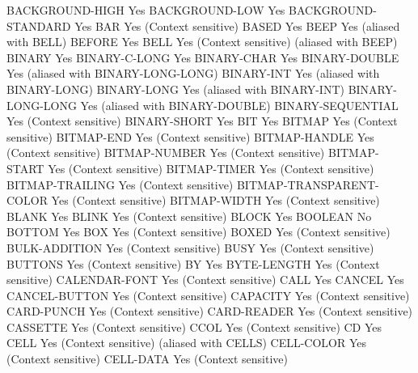 BACKGROUND-HIGH                 Yes
BACKGROUND-LOW                  Yes
BACKGROUND-STANDARD             Yes
BAR                             Yes (Context sensitive)
BASED                           Yes
BEEP                            Yes (aliased with BELL)
BEFORE                          Yes
BELL                            Yes (Context sensitive) (aliased with BEEP)
BINARY                          Yes
BINARY-C-LONG                   Yes
BINARY-CHAR                     Yes
BINARY-DOUBLE                   Yes (aliased with BINARY-LONG-LONG)
BINARY-INT                      Yes (aliased with BINARY-LONG)
BINARY-LONG                     Yes (aliased with BINARY-INT)
BINARY-LONG-LONG                Yes (aliased with BINARY-DOUBLE)
BINARY-SEQUENTIAL               Yes (Context sensitive)
BINARY-SHORT                    Yes
BIT                             Yes
BITMAP                          Yes (Context sensitive)
BITMAP-END                      Yes (Context sensitive)
BITMAP-HANDLE                   Yes (Context sensitive)
BITMAP-NUMBER                   Yes (Context sensitive)
BITMAP-START                    Yes (Context sensitive)
BITMAP-TIMER                    Yes (Context sensitive)
BITMAP-TRAILING                 Yes (Context sensitive)
BITMAP-TRANSPARENT-COLOR        Yes (Context sensitive)
BITMAP-WIDTH                    Yes (Context sensitive)
BLANK                           Yes
BLINK                           Yes (Context sensitive)
BLOCK                           Yes
BOOLEAN                         No
BOTTOM                          Yes
BOX                             Yes (Context sensitive)
BOXED                           Yes (Context sensitive)
BULK-ADDITION                   Yes (Context sensitive)
BUSY                            Yes (Context sensitive)
BUTTONS                         Yes (Context sensitive)
BY                              Yes
BYTE-LENGTH                     Yes (Context sensitive)
CALENDAR-FONT                   Yes (Context sensitive)
CALL                            Yes
CANCEL                          Yes
CANCEL-BUTTON                   Yes (Context sensitive)
CAPACITY                        Yes (Context sensitive)
CARD-PUNCH                      Yes (Context sensitive)
CARD-READER                     Yes (Context sensitive)
CASSETTE                        Yes (Context sensitive)
CCOL                            Yes (Context sensitive)
CD                              Yes
CELL                            Yes (Context sensitive) (aliased with CELLS)
CELL-COLOR                      Yes (Context sensitive)
CELL-DATA                       Yes (Context sensitive)

